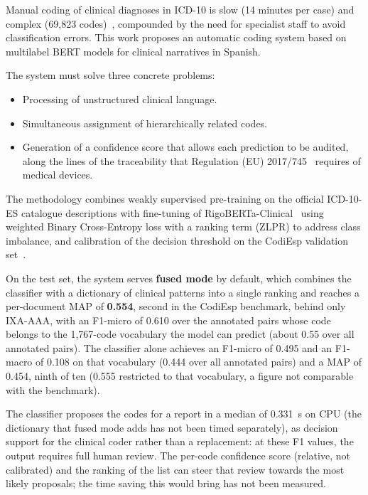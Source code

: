 \begin{resumenAlt}[english]{\tituloCortoAlt}
\renewcommand{\keywordslist}{ICD-10, BERT, multilabel classification, clinical coding, natural language processing}
Manual coding of clinical diagnoses in ICD-10 is slow (14 minutes per case) and complex (69,823 codes)~\cite{gogorcena2017cie10es, sanidad2016cie10}, compounded by the need for specialist staff to avoid classification errors. This work proposes an automatic coding system based on multilabel BERT models for clinical narratives in Spanish.

The system must solve three concrete problems:

\begin{itemize}
 \item Processing of unstructured clinical language.
 \item Simultaneous assignment of hierarchically related codes.
 \item Generation of a confidence score that allows each prediction to be audited, along the lines of the traceability that Regulation (EU) 2017/745~\cite{eu2017745} requires of medical devices.
\end{itemize}

The methodology combines weakly supervised pre-training on the official ICD-10-ES catalogue descriptions with fine-tuning of RigoBERTa-Clinical~\cite{garciasubies2026rigobertaclinical} using weighted Binary Cross-Entropy loss with a ranking term (ZLPR) to address class imbalance, and calibration of the decision threshold on the CodiEsp validation set~\cite{miranda2020}.

On the test set, the system serves \textbf{fused mode} by default, which combines the classifier with a dictionary of clinical patterns into a single ranking and reaches a per-document MAP of \textbf{0.554}, second in the CodiEsp benchmark, behind only IXA-AAA, with an F1-micro of 0.610 over the annotated pairs whose code belongs to the 1,767-code vocabulary the model can predict (about 0.55 over all annotated pairs). The classifier alone achieves an F1-micro of 0.495 and an F1-macro of 0.108 on that vocabulary (0.444 over all annotated pairs) and a MAP of 0.454, ninth of ten (0.555 restricted to that vocabulary, a figure not comparable with the benchmark).

The classifier proposes the codes for a report in a median of 0.331~s on CPU (the dictionary that fused mode adds has not been timed separately), as decision support for the clinical coder rather than a replacement: at these F1 values, the output requires full human review. The per-code confidence score (relative, not calibrated) and the ranking of the list can steer that review towards the most likely proposals; the time saving this would bring has not been measured.


\end{resumenAlt}
